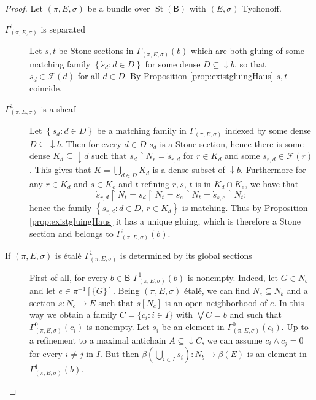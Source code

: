 \documentclass[11pt]{amsart}
\newcommand{\F}{\mathcal{F}}
\theoremstyle{plain}
\theoremstyle{definition}
\theoremstyle{plain}
\theoremstyle{remark}
\DeclareMathOperator{\St}{St}
\newcommand{\bool}[1]{\mathsf{#1}}
\newcommand{\bp}[1]{\left\lbrace #1 \right\rbrace}
\newcommand{\0}{\mathsf{0}}
\renewcommand{\1}{\mathsf{1}}
\renewcommand{\2}{\mathsf{2}}
\theoremstyle{definition}
\begin{document}
 \begin{proof}
Let $(\pi, E, \sigma)$ be a bundle over $\St(\bool{B})$ with $(E,\sigma)$ Tychonoff.
\begin{description}
\item[$\Gamma^1_{(\pi, E, \sigma)}$ is separated]
Let $s,t$ be Stone sections in $\Gamma_{(\pi, E, \sigma)}(b)$ which are both gluing of 
some matching family
$\bp{\dot{s}_d:d\in D}$ for some dense $D\subseteq\downarrow b$, so that $s_d\in\F(d)$ for all $d\in D$.
By Proposition \ref{prop:existgluingHaus} $s,t$ coincide.

 
\item[$\Gamma^1_{(\pi, E, \sigma)}$ is a sheaf]
Let $\bp{s_d:d\in D}$ be a matching family in 
\(\Gamma_{(\pi, E, \sigma)}\)
indexed by some dense $D\subseteq\downarrow b$. 
Then for every $d\in D$ $s_d$ is a Stone section, hence there is some dense $K_d\subseteq\downarrow d$ such that $s_d\restriction N_r=\dot{s}_{r,d}$ for $r\in K_d$ and some $s_{r,d}\in \F(r)$.
This gives that $K=\bigcup_{d\in D}K_d$ is a dense subset of $\downarrow b$. Furthermore for any $r\in K_d$ and $s \in K_e$ and $t$ refining $r,s$, $t$ is in $K_d\cap K_e$, we have that 
\[
\dot{s}_{r,d}\restriction N_{t}=s_d\restriction N_{t}=s_e\restriction N_{t}=\dot{s}_{s,e}\restriction N_{t};
\]
hence the family 
$\bp{\dot{s}_{r,d}:d\in D,\,r\in K_d}$ 
is matching. 
Thus by Proposition \ref{prop:existgluingHaus} it has a unique gluing, which is therefore a Stone section and belongs to $\Gamma^1_{(\pi, E, \sigma)}(b)$. 
\item[If $(\pi, E, \sigma)$ is \'etal\'e $\Gamma^1_{(\pi, E, \sigma)}$ is determined by its global sections]
First of all, for every $b\in\bool{B}$ $\Gamma^1_{(\pi, E, \sigma)}(b)$ is nonempty. Indeed, let $G\in N_b$ and let $e\in\pi^{-1}[\{G\}]$. Being $(\pi, E, \sigma)$ \'etal\'e, we can find $N_c\subseteq N_b$ and a section $s:N_c\to E$ such that $s[N_c]$ is an open neighborhood of $e$. In this way we obtain a family $C=\{c_i: i\in I\}$ with $\bigvee C=b$ and such that $\Gamma^0_{(\pi, E, \sigma)}(c_i)$ is nonempty. Let $s_i$ be an element in $\Gamma^0_{(\pi, E, \sigma)}(c_i)$. Up to a refinement to a maximal antichain $A\subseteq\downarrow C$, we can assume $c_i\wedge c_j=0$ for every $i\neq j$ in $I$. But then $\beta(\bigcup_{i\in I}s_i):N_b\to\beta(E)$ is an element in $\Gamma^1_{(\pi, E, \sigma)}(b)$. 


\end{description}
\end{proof}
\end{document}
